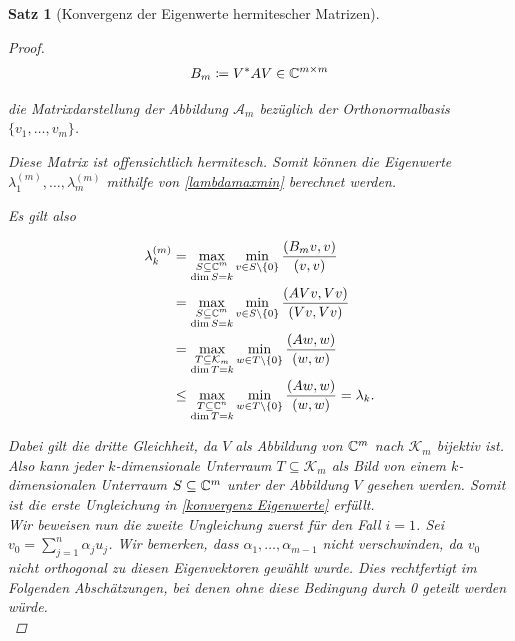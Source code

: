 \documentclass{article}
\theoremstyle{plain}
\newtheorem{theorem}    {Satz}   [section]
\begin{document}
\begin{theorem}[Konvergenz der Eigenwerte hermitescher Matrizen]
\begin{proof}
	\begin{equation*}
		B_m \coloneqq V^* A V \in \mathbb{C}^{m\times m}
	\end{equation*}

	die Matrixdarstellung der Abbildung $\mathcal{A}_m$ bezüglich der Orthonormalbasis $\{v_1,\dots,v_m\}$.

	Diese Matrix ist offensichtlich hermitesch. Somit können die Eigenwerte $\lambda_1^{(m)}, \dots, \lambda_m^{(m)}$ mithilfe von \eqref{lambdamaxmin} berechnet werden.

	Es gilt also

	\begin{equation}
		\label{Eigenwert_Ungl}
		\begin{aligned}
			\lambda_k^{(m)} &= \max_{\substack{S \subseteq \mathbb{C}^m\\ \dim S = k}} \min_{v\in S\setminus\{0\}} \frac{(B_m v,v)}{(v,v)} \\
			&= \max_{\substack{S \subseteq \mathbb{C}^m\\ \dim S = k}} \min_{v\in S\setminus\{0\}} \frac{(AVv,Vv)}{(Vv,Vv)}\\
			&= \max_{\substack{T \subseteq \mathcal{K}_m \\ \dim T = k}} \min_{w\in T\setminus\{0\}} \frac{(Aw,w)}{(w,w)}\\
			 &\le \max_{\substack{T \subseteq \mathbb{C}^n\\ \dim T = k}} \min_{w\in T\setminus\{0\}} \frac{(Aw,w)}{(w,w)} = \lambda_k.
		\end{aligned}
	\end{equation}

	Dabei gilt die dritte Gleichheit, da $V$ als Abbildung von $\mathbb{C}^m$ nach $\mathcal{K}_m$ bijektiv ist. Also kann jeder $k$-dimensionale Unterraum $T \subseteq \mathcal{K}_m$ als Bild von einem $k$-dimensionalen Unterraum $S \subseteq \mathbb{C}^m$ unter der Abbildung $V$ gesehen werden.
	Somit ist die erste Ungleichung in \eqref{konvergenz Eigenwerte} erfüllt.\\

	Wir beweisen nun die zweite Ungleichung zuerst für den Fall $i = 1$.
	Sei $v_0 = \sum_{j=1}^{n}\alpha_j u_j$. Wir bemerken, dass $\alpha_1, \dots, \alpha_{m-1}$ nicht verschwinden, da $v_0$ nicht orthogonal zu diesen Eigenvektoren gewählt wurde. Dies rechtfertigt im Folgenden Abschätzungen, bei denen ohne diese Bedingung durch 0 geteilt werden würde.\\


\end{proof}
\end{theorem}
\end{document}
